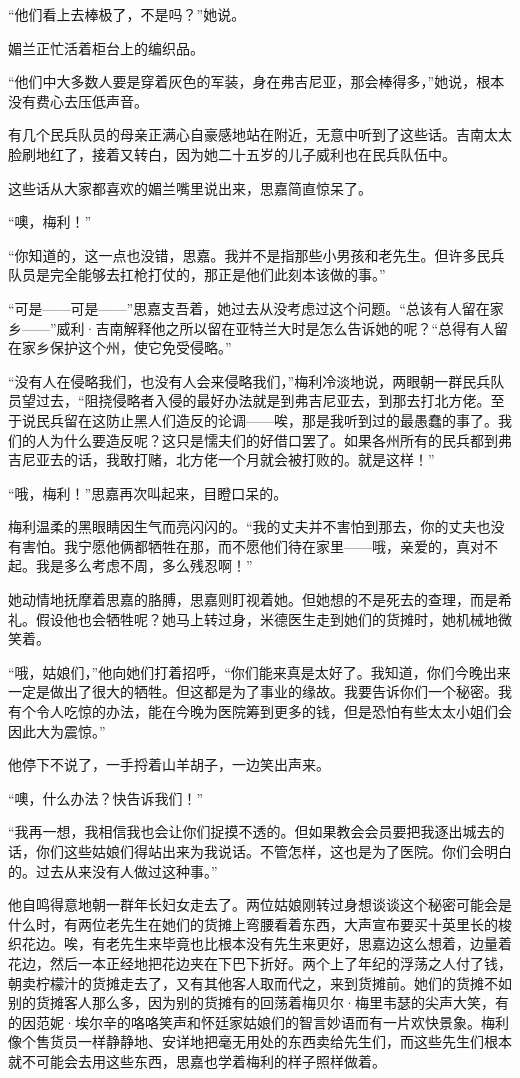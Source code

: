 \par “他们看上去棒极了，不是吗？”她说。
\par 媚兰正忙活着柜台上的编织品。
\par “他们中大多数人要是穿着灰色的军装，身在弗吉尼亚，那会棒得多，”她说，根本没有费心去压低声音。
\par 有几个民兵队员的母亲正满心自豪感地站在附近，无意中听到了这些话。吉南太太脸刷地红了，接着又转白，因为她二十五岁的儿子威利也在民兵队伍中。
\par 这些话从大家都喜欢的媚兰嘴里说出来，思嘉简直惊呆了。
\par “噢，梅利！”
\par “你知道的，这一点也没错，思嘉。我并不是指那些小男孩和老先生。但许多民兵队员是完全能够去扛枪打仗的，那正是他们此刻本该做的事。”
\par “可是——可是——”思嘉支吾着，她过去从没考虑过这个问题。“总该有人留在家乡——”威利·吉南解释他之所以留在亚特兰大时是怎么告诉她的呢？“总得有人留在家乡保护这个州，使它免受侵略。”
\par “没有人在侵略我们，也没有人会来侵略我们，”梅利冷淡地说，两眼朝一群民兵队员望过去，“阻挠侵略者入侵的最好办法就是到弗吉尼亚去，到那去打北方佬。至于说民兵留在这防止黑人们造反的论调——唉，那是我听到过的最愚蠢的事了。我们的人为什么要造反呢？这只是懦夫们的好借口罢了。如果各州所有的民兵都到弗吉尼亚去的话，我敢打赌，北方佬一个月就会被打败的。就是这样！”
\par “哦，梅利！”思嘉再次叫起来，目瞪口呆的。
\par 梅利温柔的黑眼睛因生气而亮闪闪的。“我的丈夫并不害怕到那去，你的丈夫也没有害怕。我宁愿他俩都牺牲在那，而不愿他们待在家里——哦，亲爱的，真对不起。我是多么考虑不周，多么残忍啊！”
\par 她动情地抚摩着思嘉的胳膊，思嘉则盯视着她。但她想的不是死去的查理，而是希礼。假设他也会牺牲呢？她马上转过身，米德医生走到她们的货摊时，她机械地微笑着。
\par “哦，姑娘们，”他向她们打着招呼，“你们能来真是太好了。我知道，你们今晚出来一定是做出了很大的牺牲。但这都是为了事业的缘故。我要告诉你们一个秘密。我有个令人吃惊的办法，能在今晚为医院筹到更多的钱，但是恐怕有些太太小姐们会因此大为震惊。”
\par 他停下不说了，一手捋着山羊胡子，一边笑出声来。
\par “噢，什么办法？快告诉我们！”
\par “我再一想，我相信我也会让你们捉摸不透的。但如果教会会员要把我逐出城去的话，你们这些姑娘们得站出来为我说话。不管怎样，这也是为了医院。你们会明白的。过去从来没有人做过这种事。”
\par 他自鸣得意地朝一群年长妇女走去了。两位姑娘刚转过身想谈谈这个秘密可能会是什么时，有两位老先生在她们的货摊上弯腰看着东西，大声宣布要买十英里长的梭织花边。唉，有老先生来毕竟也比根本没有先生来更好，思嘉边这么想着，边量着花边，然后一本正经地把花边夹在下巴下折好。两个上了年纪的浮荡之人付了钱，朝卖柠檬汁的货摊走去了，又有其他客人取而代之，来到货摊前。她们的货摊不如别的货摊客人那么多，因为别的货摊有的回荡着梅贝尔·梅里韦瑟的尖声大笑，有的因范妮·埃尔辛的咯咯笑声和怀廷家姑娘们的智言妙语而有一片欢快景象。梅利像个售货员一样静静地、安详地把毫无用处的东西卖给先生们，而这些先生们根本就不可能会去用这些东西，思嘉也学着梅利的样子照样做着。
